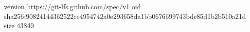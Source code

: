 version https://git-lfs.github.com/spec/v1
oid sha256:90824144362522ce4954742a0e293658da1bb0676699743bde85d1b2b510a21d
size 43840
